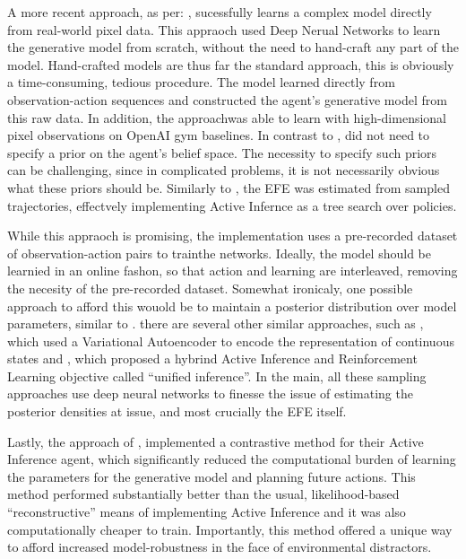 \documentclass[onecolumn]{IEEEtran}
\begin{document}
A more recent approach, as per: \textcite{Learn-Gen-State-Space-Models-AIF}, sucessfully learns a complex model directly from real-world pixel data. This appraoch used Deep Nerual Networks to learn the generative model from scratch, without the need to hand-craft any part of the model. Hand-crafted models are thus far the standard approach, this is obviously a time-consuming, tedious procedure. The model learned directly from observation-action sequences and constructed the agent's generative model from this raw data. In addition, the approachwas able to learn with high-dimensional pixel observations on OpenAI gym baselines. 
In contrast to \textcite{Scaling-AIF}, \textcite{Learn-Gen-State-Space-Models-AIF} did not need to specify a prior on the agent's belief space. The necessity to specify such priors can be challenging, since in complicated problems, it is not necessarily obvious what these priors should be. Similarly to \textcite{Scaling-AIF}, the EFE was estimated from sampled trajectories, effectvely implementing Active Infernce as a tree search over policies. 

While this appraoch is promising, the implementation uses a pre-recorded dataset of observation-action pairs to trainthe networks. Ideally, the model should be learnied in an online fashon, so that action and learning are interleaved, removing the necesity of the pre-recorded dataset. Somewhat ironicaly, one possible approach to afford this wouold be to maintain a posterior distribution over model parameters, similar to \textcite{Scaling-AIF}. there are several other similar approaches, such as \textcite{DEEP-AIF-For-POMDPs}, which used a Variational Autoencoder to encode the representation of continuous states and \textcite{Combine-Info-Seek-Explore-and-Reward-Maximization-Under-POMDP}, which proposed a hybrind Active Inference and Reinforcement Learning objective called ``unified inference''. In the main, all these sampling approaches use deep neural networks to finesse the issue of estimating the posterior densities at issue, and most crucially the EFE itself.

Lastly, the approach of \textcite{Contrastive-AIF}, implemented a contrastive method for their Active Inference agent, which significantly reduced the computational burden of learning the parameters for the generative model and planning future actions. This method performed substantially better than the usual, likelihood-based ``reconstructive'' means of implementing Active Inference and it was also computationally cheaper to train. Importantly, this method offered a unique way to afford increased model-robustness in the face of environmental distractors. 
\end{document}
